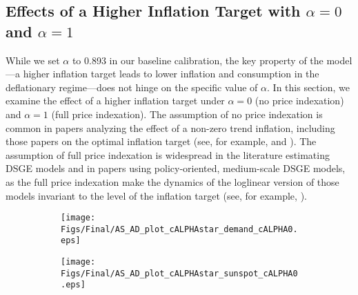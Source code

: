 \documentclass[11pt]{article}
\begin{document}
\begin{singlespace}

		\section{Effects of a Higher Inflation Target with $\alpha=0$ and $\alpha=1$}
		\label{A:Alpha}

		 While we set $\alpha$ to 0.893 in our baseline calibration, the key property of the model---a higher inflation target leads to lower inflation and consumption in the deflationary regime---does not hinge on the specific value of $\alpha$. In this section, we examine the effect of a higher inflation target under $\alpha=0$ (no price indexation) and $\alpha=1$ (full price indexation). The assumption of no price indexation is common in papers analyzing the effect of a non-zero trend inflation, including those papers on the optimal inflation target (see, for example, \citet{Ascari2004} and \citet{AscariCastelnuovoRossi2011}). The assumption of full price indexation is widespread in the literature estimating DSGE models and in papers using policy-oriented, medium-scale DSGE models, as the full price indexation make the dynamics of the loglinear version of those models invariant to the level of the inflation target (see, for example, \citet{SmetsWouters2007}).
		 
		 \begin{figure}[h]
			\caption{AD and AS Curves: $\alpha = 0$} \label{fig:ASAD_alpha0}
	        \vspace{-1em}
			\begin{center}
				\begin{subfigure}[b]{0.4\textwidth}
					\centering		        	\texttt{[image: Figs/Final/AS\_AD\_plot\_cALPHAstar\_demand\_cALPHA0.eps]}
				\end{subfigure}
				\hspace{0.5cm}     
				\begin{subfigure}[b]{0.4\textwidth}
					\centering					\texttt{[image: Figs/Final/AS\_AD\_plot\_cALPHAstar\_sunspot\_cALPHA0.eps]}
				\end{subfigure}
			\end{center}
		\end{figure}
		

\end{singlespace}
\end{document}
